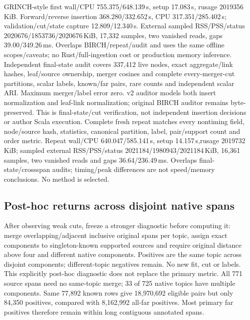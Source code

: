 \documentclass[11pt]{article}
\begin{document}
GRINCH-style first wall/CPU 755.375/648.139\,s, setup 17.083\,s,
rusage 2019356\,KiB. Forward/reverse insertion 368.280/332.652\,s,
CPU 317.351/285.402\,s; validation/cut/state capture 12.809/12.340\,s.
External sampled RSS/PSS/status 2020676/1853736/2020676\,KiB, 17,332 samples,
two vanished reads, gaps 39.00/349.26\,ms. Overlaps BIRCH/repeat/audit and uses
the same offline scopes/caveats; no Rust/full-ingestion cost or production
memory inference. Independent final-state audit covers 337,412 live nodes,
exact aggregate/link hashes, leaf/source ownership, merger cosines and complete
every-merger-cut partitions, scalar labels, known/far pairs, rare counts and
independent scalar ARI. Maximum merger/label error zero. v2 auditor models both
insert normalization and leaf-link normalization; original BIRCH auditor remains
byte-preserved. This is final-state/cut verification, not independent insertion
decisions or author Scala execution. Complete fresh repeat matches every
nontiming field, node/source hash, statistics, canonical partition, label,
pair/support count and order metric. Repeat wall/CPU 640.047/585.141\,s,
setup 14.157\,s,rusage 2019732\,KiB; sampled external RSS/PSS/status
2021184/1980943/2021184\,KiB, 16,361 samples, two vanished reads and gaps
36.64/236.49\,ms. Overlaps final-state/crossspan audits; timing/peak differences
are not speed/memory conclusions. No method is selected.

\subsection{Post-hoc returns across disjoint native spans}
After observing weak cuts, freeze a stronger diagnostic before computing it:
merge overlapping/adjacent inclusive original spans per topic, assign exact
components to singleton-known supported sources and require original distance
above four and different native components. Positives are the same topic across
disjoint components; different-topic negatives remain. No new fit, cut or labels.
This explicitly post-hoc diagnostic does not replace the primary metric.
All 771 source spans need no same-topic merge; 33 of 725 native topics have
multiple components. Same 77,892 known rows give 18,970,692 eligible pairs but
only 84,350 positives, compared with 8,162,992 all-far positives. Most primary
far positives therefore remain within long contiguous annotated spans.
\end{document}
